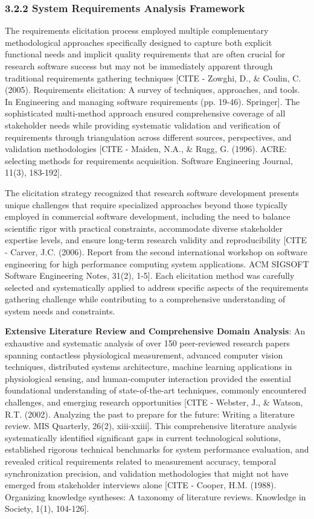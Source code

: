 \documentclass[12pt,a4paper]{article}
\begin{document}
\subsubsection{3.2.2 System Requirements Analysis Framework}

The requirements elicitation process employed multiple complementary methodological approaches specifically designed to
capture both explicit functional needs and implicit quality requirements that are often crucial for research software
success but may not be immediately apparent through traditional requirements gathering
techniques [CITE - Zowghi, D., \& Coulin, C. (2005). Requirements elicitation: A survey of techniques, approaches, and tools. In Engineering and managing software requirements (pp. 19-46). Springer].
The sophisticated multi-method approach ensured comprehensive coverage of all stakeholder needs while providing
systematic validation and verification of requirements through triangulation across different sources, perspectives, and
validation
methodologies [CITE - Maiden, N.A., \& Rugg, G. (1996). ACRE: selecting methods for requirements acquisition. Software Engineering Journal, 11(3), 183-192].

The elicitation strategy recognized that research software development presents unique challenges that require
specialized approaches beyond those typically employed in commercial software development, including the need to balance
scientific rigor with practical constraints, accommodate diverse stakeholder expertise levels, and ensure long-term
research validity and
reproducibility [CITE - Carver, J.C. (2006). Report from the second international workshop on software engineering for high performance computing system applications. ACM SIGSOFT Software Engineering Notes, 31(2), 1-5].
Each elicitation method was carefully selected and systematically applied to address specific aspects of the
requirements gathering challenge while contributing to a comprehensive understanding of system needs and constraints.

\textbf{Extensive Literature Review and Comprehensive Domain Analysis}: An exhaustive and systematic analysis of over 150
peer-reviewed research papers spanning contactless physiological measurement, advanced computer vision techniques,
distributed systems architecture, machine learning applications in physiological sensing, and human-computer interaction
provided the essential foundational understanding of state-of-the-art techniques, commonly encountered challenges, and
emerging research
opportunities [CITE - Webster, J., \& Watson, R.T. (2002). Analyzing the past to prepare for the future: Writing a literature review. MIS Quarterly, 26(2), xiii-xxiii].
This comprehensive literature analysis systematically identified significant gaps in current technological solutions,
established rigorous technical benchmarks for system performance evaluation, and revealed critical requirements related
to measurement accuracy, temporal synchronization precision, and validation methodologies that might not have emerged
from stakeholder interviews
alone [CITE - Cooper, H.M. (1988). Organizing knowledge syntheses: A taxonomy of literature reviews. Knowledge in Society, 1(1), 104-126].
\end{document}

